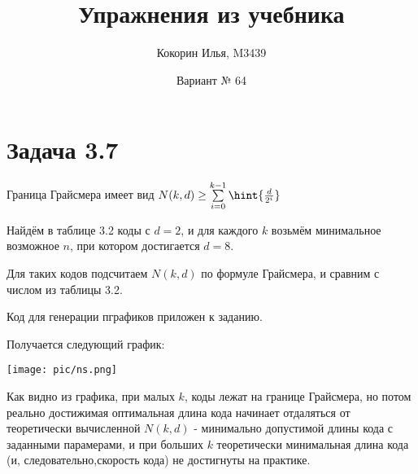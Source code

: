 \documentclass{article}
\title{Упражнения из учебника}
\author{Кокорин Илья, M3439}
\date{Вариант № 64}
\DeclarePairedDelimiter{\hint}\lceil\rceil
\begin{document}
	\maketitle
	\section{Задача 3.7}
	
	Граница Грайсмера имеет вид $N(k, d) \geq \sum\limits_{i = 0}^{k - 1} \hint{\frac{d}{2^i}}$
	
	Найдём в таблице 3.2 коды с $d = 2$, и для каждого $k$ возьмём минимальное возможное $n$, при котором достигается $d = 8$.
	
	Для таких кодов подсчитаем $N(k, d)$ по формуле Грайсмера, и сравним с числом из таблицы 3.2.
	
	 Код для генерации пграфиков приложен к заданию.
	 
	 Получается следующий график:
	 
	 \texttt{[image: pic/ns.png]}
	 
	Как видно из графика, при малых $k$, коды лежат на границе Грайсмера, но потом реально достижимая оптимальная длина кода начинает отдаляться от теоретически вычисленной $N(k, d)$ - минимально допустимой длины кода с заданными парамерами, и при больших $k$ теоретически минимальная длина кода (и,  следовательно,скорость кода) не достигнуты на практике. 
\end{document}
